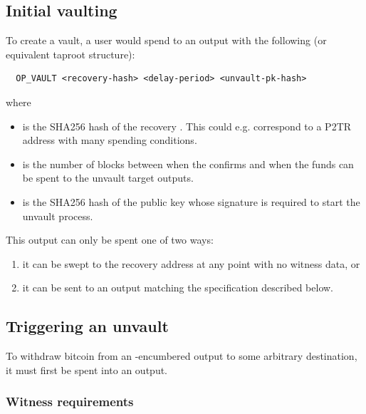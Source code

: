 \documentclass[10pt]{article}
\begin{document}
\subsection*{Initial vaulting}

To create a vault, a user would spend to an output with the following
\spk{} (or equivalent taproot structure):

\begin{verbatim}
  OP_VAULT <recovery-hash> <delay-period> <unvault-pk-hash> 
\end{verbatim}
\noindent where

\begin{itemize}
  \item {} is the SHA256 hash of the recovery \spk{}. This could
    e.g. correspond to a P2TR address with many spending conditions.

  \item {} is the number of blocks between when the \opuv{} confirms
    and when the funds can be spent to the unvault target outputs.

  \item {} is the SHA256 hash of the public key whose signature is
    required to start the unvault process.

\end{itemize}

This output can only be spent one of two ways: 

\begin{enumerate}
  \item it can be swept to the recovery address at any point with no witness data, or
  \item it can be sent to an \opuv{} output matching the specification described
    below.
\end{enumerate}



\subsection*{Triggering an unvault}

To withdraw bitcoin from an \opv{}-encumbered output to some arbitrary destination, it
must first be spent into an \opuv{} output.

\subsubsection*{Witness requirements}
\end{document}
